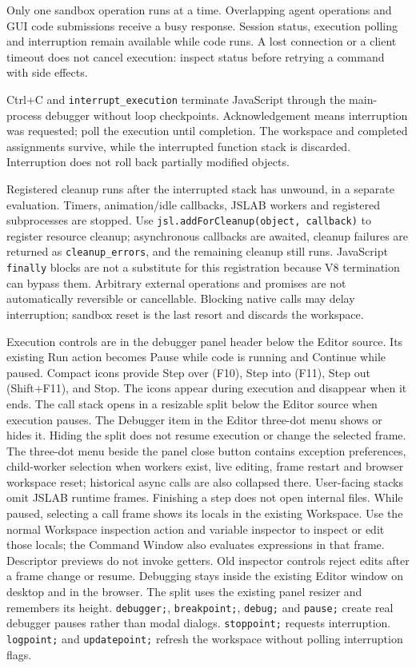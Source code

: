 \documentclass[12pt,a4paper]{article}
\begin{document}
Only one sandbox operation runs at a time. Overlapping agent operations and GUI code submissions receive a busy response. Session status, execution polling and interruption remain available while code runs. A lost connection or a client timeout does not cancel execution: inspect status before retrying a command with side effects.

Ctrl+C and \texttt{interrupt\_execution} terminate JavaScript through the main-process debugger without loop checkpoints. Acknowledgement means interruption was requested; poll the execution until completion. The workspace and completed assignments survive, while the interrupted function stack is discarded. Interruption does not roll back partially modified objects.

Registered cleanup runs after the interrupted stack has unwound, in a separate evaluation. Timers, animation/idle callbacks, JSLAB workers and registered subprocesses are stopped. Use \texttt{jsl.addForCleanup(object, callback)} to register resource cleanup; asynchronous callbacks are awaited, cleanup failures are returned as \texttt{cleanup\_errors}, and the remaining cleanup still runs. JavaScript \texttt{finally} blocks are not a substitute for this registration because V8 termination can bypass them. Arbitrary external operations and promises are not automatically reversible or cancellable. Blocking native calls may delay interruption; sandbox reset is the last resort and discards the workspace.

Execution controls are in the debugger panel header below the Editor source. Its existing Run action becomes Pause while code is running and Continue while paused. Compact icons provide Step over (F10), Step into (F11), Step out (Shift+F11), and Stop. The icons appear during execution and disappear when it ends. The call stack opens in a resizable split below the Editor source when execution pauses. The Debugger item in the Editor three-dot menu shows or hides it. Hiding the split does not resume execution or change the selected frame. The three-dot menu beside the panel close button contains exception preferences, child-worker selection when workers exist, live editing, frame restart and browser workspace reset; historical async calls are also collapsed there. User-facing stacks omit JSLAB runtime frames. Finishing a step does not open internal files. While paused, selecting a call frame shows its locals in the existing Workspace. Use the normal Workspace inspection action and variable inspector to inspect or edit those locals; the Command Window also evaluates expressions in that frame. Descriptor previews do not invoke getters. Old inspector controls reject edits after a frame change or resume. Debugging stays inside the existing Editor window on desktop and in the browser. The split uses the existing panel resizer and remembers its height. \texttt{debugger;}, \texttt{breakpoint;}, \texttt{debug;} and \texttt{pause;} create real debugger pauses rather than modal dialogs. \texttt{stoppoint;} requests interruption. \texttt{logpoint;} and \texttt{updatepoint;} refresh the workspace without polling interruption flags.
\end{document}
